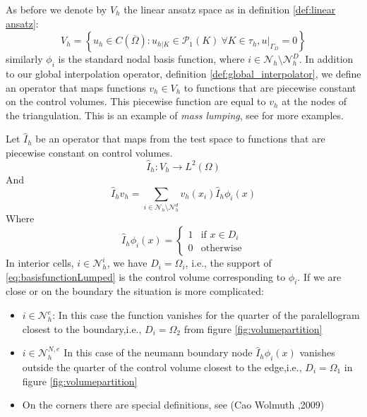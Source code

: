 \documentclass[../Main/main.tex]{subfiles}
\begin{document}
	\par 
	As before we denote by $V_h$ the linear ansatz space as in definition \ref{def:linear ansatz}:
	\begin{equation*}
	V_h = \left \{ u_h \in C(\overline{\Omega}) : u_{h|K} \in \mathcal{P}_1(K) \ \forall K \in \tau_h, u|_{\Gamma_D} = 0  \right \}
	\end{equation*}
	 similarly $\phi_i$ is the standard nodal basis function, where $i \in \mathcal{N}_h \setminus \mathcal{N}_h^D$.
	In addition to our global interpolation operator, definition \ref{def:global_interpolator}, we define an operator that maps functions $v_h \in V_h$ to functions that are piecewise constant on the control volumes. This piecewise function are equal to $v_h$ at the nodes of the triangulation. This is an example of \emph{mass lumping}, see \cite{baranger1996connection} for more examples.
	\begin{definition} \label{def:piecewise_interpolator}
		Let $\hat{I}_h$ be an operator that maps from the test space to functions that are piecewise constant on control volumes.
		\begin{equation*}
			\hat{I}_h:V_h\rightarrow L^2(\Omega)
		\end{equation*}
		And
		\begin{equation*}
			\hat{I}_h v_h = \sum_{i\in \mathcal{N}_h\setminus\mathcal{N}_h^d}v_h(x_i)\hat{I}_h\phi_i(x)
		\end{equation*}
		Where
		\begin{equation}\label{eq:basisfunctionLumped}
			\hat{I}_h\phi_i(x)=\left\{\begin{matrix}
				1 & \text{if } x\in D_i\\ 
				0 & \text{otherwise}
			\end{matrix}\right.
		\end{equation}
		In interior cells, $i\in \mathcal{N}_h^i$, we have $D_i = \Omega_i$, i.e., the support of \eqref{eq:basisfunctionLumped} is the control volume corresponding to $\phi_i$. If we are close or on the boundary the situation is more complicated: 
		\begin{itemize}
			\item $i \in \mathcal{N}_h^e$: In this case the function vanishes for the quarter of the paralellogram closest to the boundary,i.e., $D_i = \Omega_2$ from figure \ref{fig:volumepartition}
			\item $i \in \mathcal{N}_h^{N,e}$ In this case of the neumann boundary node $	\hat{I}_h\phi_i(x)$ vanishes outside the quarter of the control volume closest to the edge,i.e., $D_i = \Omega_1$ in figure \ref{fig:volumepartition}
			\item On the corners there are special definitions, see (Cao Wolmuth \cite{https://doi.org/10.1002/num.20525},2009)
		\end{itemize} 
	\end{definition}
\end{document}
